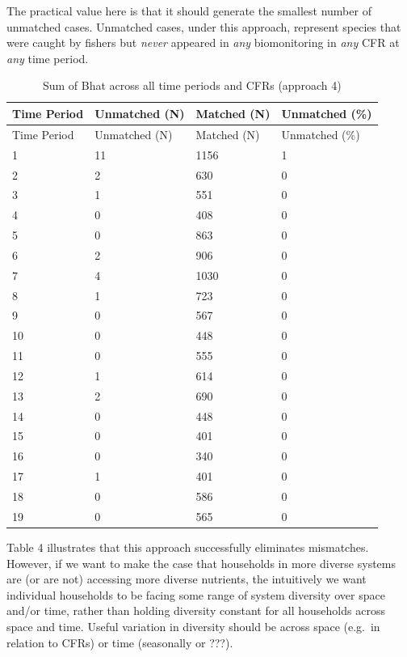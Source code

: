 \documentclass[
]{article}
\begin{document}
The practical value here is that it should generate the smallest number
of unmatched cases. Unmatched cases, under this approach, represent
species that were caught by fishers but \emph{never} appeared in
\emph{any} biomonitoring in \emph{any} CFR at \emph{any} time period.

\begin{longtable}[]{@{}llll@{}}
\caption{Sum of Bhat across all time periods and CFRs (approach
4)}\tabularnewline
\toprule
Time Period & Unmatched (N) & Matched (N) & Unmatched (\%) \\
\midrule
\endfirsthead
\toprule
Time Period & Unmatched (N) & Matched (N) & Unmatched (\%) \\
\midrule
\endhead
1 & 11 & 1156 & 1 \\
2 & 2 & 630 & 0 \\
3 & 1 & 551 & 0 \\
4 & 0 & 408 & 0 \\
5 & 0 & 863 & 0 \\
6 & 2 & 906 & 0 \\
7 & 4 & 1030 & 0 \\
8 & 1 & 723 & 0 \\
9 & 0 & 567 & 0 \\
10 & 0 & 448 & 0 \\
11 & 0 & 555 & 0 \\
12 & 1 & 614 & 0 \\
13 & 2 & 690 & 0 \\
14 & 0 & 448 & 0 \\
15 & 0 & 401 & 0 \\
16 & 0 & 340 & 0 \\
17 & 1 & 401 & 0 \\
18 & 0 & 586 & 0 \\
19 & 0 & 565 & 0 \\
\bottomrule
\end{longtable}

Table 4 illustrates that this approach successfully eliminates
mismatches. However, if we want to make the case that households in more
diverse systems are (or are not) accessing more diverse nutrients, the
intuitively we want individual households to be facing some range of
system diversity over space and/or time, rather than holding diversity
constant for all households across space and time. Useful variation in
diversity should be across space (e.g.~in relation to CFRs) or time
(seasonally or ???).\\
\strut \\
\end{document}
